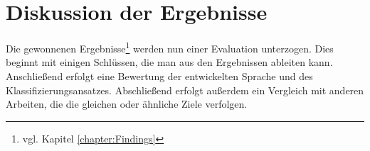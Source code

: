 \chapter{Diskussion der Ergebnisse}
    \label{chapter:FindingsDiscussion}
    Die gewonnenen Ergebnisse\footnote{vgl. Kapitel \ref{chapter:Findings}}
    werden nun einer Evaluation unterzogen.
    Dies beginnt mit einigen Schlüssen,
    die man aus den Ergebnissen ableiten kann.
    Anschließend erfolgt eine Bewertung der entwickelten Sprache
    und des Klassifizierungsansatzes.
    Abschließend erfolgt außerdem ein Vergleich mit anderen Arbeiten,
    die die gleichen oder ähnliche Ziele verfolgen.

    
    
